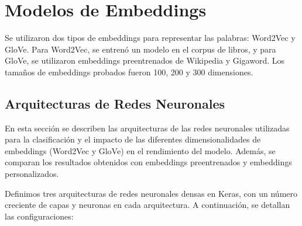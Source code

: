 \documentclass[a4]{article}
\begin{document}
\section{Modelos de Embeddings}
Se utilizaron dos tipos de embeddings para representar las palabras: Word2Vec y GloVe. Para Word2Vec, se entrenó un modelo en el corpus de libros, y para GloVe, se utilizaron embeddings preentrenados de Wikipedia y Gigaword. Los tamaños de embeddings probados fueron 100, 200 y 300 dimensiones.


\subsection{Arquitecturas de Redes Neuronales}
En esta sección se describen las arquitecturas de las redes neuronales utilizadas para la clasificación y el impacto de las diferentes dimensionalidades de embeddings (Word2Vec y GloVe) en el rendimiento del modelo. Además, se comparan los resultados obtenidos con embeddings preentrenados y embeddings personalizados.

Definimos tres arquitecturas de redes neuronales densas en Keras, con un número creciente de capas y neuronas en cada arquitectura. A continuación, se detallan las configuraciones:
\end{document}
